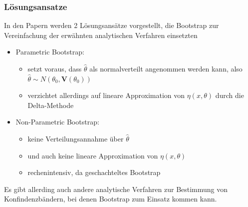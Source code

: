 \documentclass[aspectratio=1610, 9pt]{beamer}
\begin{document}
\begin{frame}
  \frametitle{Lösungsansatze}
  In den Papern werden 2 Lösungsansätze vorgestellt, die Bootstrap zur Vereinfachung der erwähnten analytischen Verfahren einsetzten
  \begin{itemize}
    \item Parametric Bootstrap:
    \begin{itemize}
      \item setzt voraus, dass $\hat\theta$ als normalverteilt angenommen werden kann, also $\hat\theta \sim N(\theta_0, \mathbf{V}(\theta_0))$
      \item verzichtet allerdings auf lineare Approximation von $\eta(x,\theta)$ durch die Delta-Methode
    \end{itemize}
    \item Non-Parametric Bootstrap:
    \begin{itemize}
      \item keine Verteilungsannahme über $\hat\theta$
      \item und auch keine lineare Approximation von $\eta(x,\theta)$
      \item rechenintensiv, da geschachteltes Bootstrap 
    \end{itemize}
  \end{itemize}
  Es gibt allerding auch andere analytische Verfahren zur Bestimmung von Konfindenzbändern, bei denen Bootstrap zum Einsatz kommen kann.
\end{frame}
\end{document}
